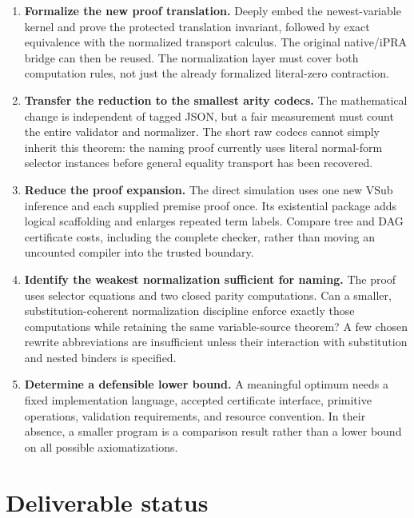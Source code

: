 \documentclass[11pt]{article}
\theoremstyle{definition}
\theoremstyle{remark}
\begin{document}
\begin{enumerate}
\item \textbf{Formalize the new proof translation.}
Deeply embed the newest-variable kernel and prove the protected
translation invariant, followed by exact equivalence with the normalized
transport calculus. The original native/iPRA bridge can then be reused.
The normalization layer must cover both computation rules, not just the
already formalized literal-zero contraction.

\item \textbf{Transfer the reduction to the smallest arity codecs.}
The mathematical change is independent of tagged JSON, but a fair
measurement must count the entire validator and normalizer. The short
raw codecs cannot simply inherit this theorem: the naming proof currently
uses literal normal-form selector instances before general equality
transport has been recovered.

\item \textbf{Reduce the proof expansion.}
The direct simulation uses one new VSub inference and each supplied
premise proof once. Its existential package adds logical scaffolding
and enlarges repeated term labels. Compare tree and DAG certificate
costs, including the complete checker, rather than moving an uncounted
compiler into the trusted boundary.

\item \textbf{Identify the weakest normalization sufficient for naming.}
The proof uses selector equations and two closed parity computations.
Can a smaller, substitution-coherent normalization discipline enforce
exactly those computations while retaining the same variable-source
theorem? A few chosen rewrite abbreviations are insufficient unless
their interaction with substitution and nested binders is specified.

\item \textbf{Determine a defensible lower bound.}
A meaningful optimum needs a fixed implementation language, accepted
certificate interface, primitive operations, validation requirements,
and resource convention. In their absence, a smaller program is a
comparison result rather than a lower bound on all possible
axiomatizations.
\end{enumerate}

\section{Deliverable status}
\end{document}
